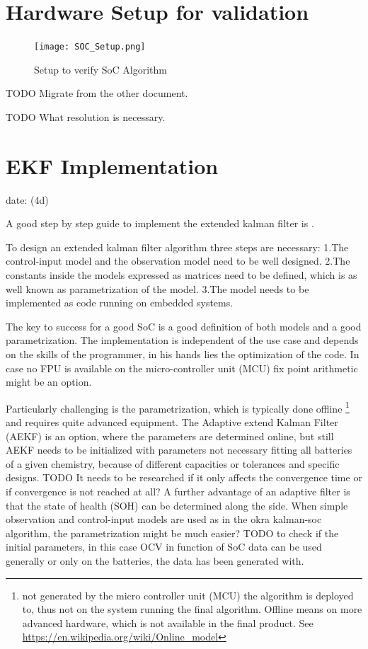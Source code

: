 \section{Hardware Setup for validation}

\begin{figure}[!ht]
\texttt{[image: SOC\_Setup.png]}
\caption{\label{fig:SoCSetup} Setup to verify SoC Algorithm}
\end{figure}



TODO Migrate from the other document.

TODO What resolution is necessary. 

\section{EKF Implementation}
date: (4d)

A good step by step guide to implement the extended kalman filter is \cite{rzepka2021implementing}.

To design an extended kalman filter algorithm three steps are necessary:
1.The control-input model and the observation model need to be well designed. 
2.The constants inside the models expressed as matrices need to be defined, which is as well known as parametrization of the model.  
3.The model needs to be implemented as code running on embedded systems. 

The key to success for a good SoC is a good definition of both models and a good parametrization. The implementation is independent of the use case and depends on the skills of the programmer, in his  hands lies the optimization of the  code. In case no FPU is available on the micro-controller unit (MCU) fix point arithmetic might be an option.  

Particularly challenging is the parametrization, which is typically done offline \footnote{not generated by the micro controller unit (MCU) the algorithm is deployed to, thus not on the system running the final algorithm. Offline means on more advanced hardware, which is not available in the final product. See \url{https://en.wikipedia.org/wiki/Online_model} } and requires quite advanced equipment. The Adaptive extend Kalman Filter (AEKF) is an option, where the parameters are determined online, but still AEKF needs to be initialized with parameters not necessary fitting all batteries of a given chemistry, because of different capacities or tolerances and specific designs. 
TODO It needs to be researched if it only affects the convergence time or if convergence is not reached at all? A further advantage of an adaptive filter is that the state of health (SOH) can be determined along the side. 
When simple observation and control-input models are used as in the okra kalman-soc algorithm, the parametrization might be much easier?
TODO to check if the initial parameters, in this case OCV in function of SoC data can be used generally or only on the batteries, the data has been generated with. \\

